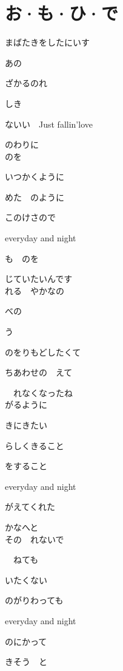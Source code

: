 \section{ お·も·ひ·で}
\large{

まばたきをしたにいす

あの

ざかるのれ

しき

ないい　Just fallin'love

のわりに
\\

のを

いつかくように

めた　のように

このけさので

everyday and night

も　のを

じていたいんです
\\

れる　やかなの

べの

う

のをりもどしたくて

ちあわせの　えて

　れなくなったね
\\

がるように

きにきたい

らしくきること

をすること

everyday and night

がえてくれた

かなへと
\\

その　れないで

　ねても

いたくない

のがりわっても

everyday and night

のにかって

きそう　と

}